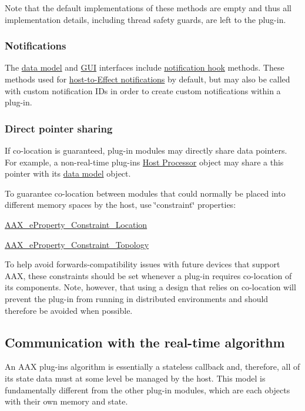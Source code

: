 Note that the default implementations of these methods are empty and thus all implementation details, including thread safety guards, are left to the plug-\/in.\hypertarget{a00330_CommonInterface_Communication_hostmodules_notifications}{}\subsubsection{Notifications}\label{a00330_CommonInterface_Communication_hostmodules_notifications}
The \hyperlink{a00328}{data model} and \hyperlink{a00329}{G\+U\+I} interfaces include \hyperlink{a00061_aa3eaeb292d2ca84086a5a058171994fd}{notification hook} methods. These methods used for \hyperlink{a00206_afab5ea2cfd731fc8f163b6caa685406e}{host-\/to-\/\+Effect notifications} by default, but may also be called with custom notification I\+Ds in order to create custom notifications within a plug-\/in.\hypertarget{a00330_CommonInterface_Communication_hostmodules_directpointersharing}{}\subsubsection{Direct pointer sharing}\label{a00330_CommonInterface_Communication_hostmodules_directpointersharing}
If co-\/location is guaranteed, plug-\/in modules may directly share data pointers. For example, a non-\/real-\/time plug-\/in\textquotesingle{}s \hyperlink{a00334}{Host Processor} object may share a {\ttfamily this} pointer with its \hyperlink{a00328}{data model} object.

To guarantee co-\/location between modules that could normally be placed into different memory spaces by the host, use \char`\"{}constraint\char`\"{} properties\+:

\begin{DoxyItemize}
\item \hyperlink{a00283_a6571f4e41a5dd06e4067249228e2249ea79a0815fea6c8f1a0d8ed511aa88e9ff}{A\+A\+X\+\_\+e\+Property\+\_\+\+Constraint\+\_\+\+Location} \item \hyperlink{a00283_a6571f4e41a5dd06e4067249228e2249ea5d7fca796aba48b5dc364af0cc633a02}{A\+A\+X\+\_\+e\+Property\+\_\+\+Constraint\+\_\+\+Topology}\end{DoxyItemize}
To help avoid forwards-\/compatibility issues with future devices that support A\+A\+X, these constraints should be set whenever a plug-\/in requires co-\/location of its components. Note, however, that using a design that relies on co-\/location will prevent the plug-\/in from running in distributed environments and should therefore be avoided when possible.\hypertarget{a00330_CommonInterface_Communication_algorithm}{}\subsection{Communication with the real-\/time algorithm}\label{a00330_CommonInterface_Communication_algorithm}
An A\+A\+X plug-\/in\textquotesingle{}s algorithm is essentially a stateless callback and, therefore, all of its state data must at some level be managed by the host. This model is fundamentally different from the other plug-\/in modules, which are each objects with their own memory and state.

